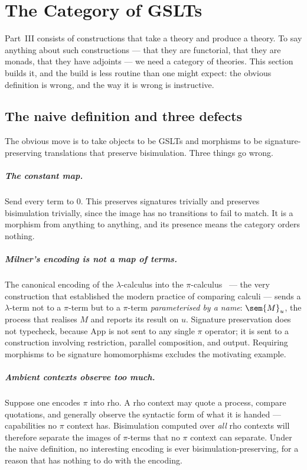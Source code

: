 \chapter{The Category of GSLTs}
\label{ch:catgslt}

Part~III consists of constructions that take a theory and produce a theory. To say
anything about such constructions --- that they are functorial, that they are monads,
that they have adjoints --- we need a category of theories. This section builds it, and
the build is less routine than one might expect: the obvious definition is wrong, and
the way it is wrong is instructive.

\section{The naive definition and three defects}

The obvious move is to take objects to be GSLTs and morphisms to be signature-preserving
translations that preserve bisimulation. Three things go wrong.

\paragraph{The constant map.} Send every term to $0$. This preserves signatures
trivially and preserves bisimulation trivially, since the image has no transitions to
fail to match. It is a morphism from anything to anything, and its presence means the
category orders nothing.

\paragraph{Milner's encoding is not a map of terms.} The canonical encoding of the
$\lambda$-calculus into the $\pi$-calculus~\cite{Milner1992} --- the very construction
that established the modern practice of comparing calculi --- sends a $\lambda$-term not
to a $\pi$-term but to a $\pi$-term \emph{parameterised by a name}: $\sem{M}_u$, the
process that realises $M$ and reports its result on $u$. Signature preservation does not
typecheck, because $\mathrm{App}$ is not sent to any single $\pi$ operator; it is sent to
a construction involving restriction, parallel composition, and output. Requiring
morphisms to be signature homomorphisms excludes the motivating example.

\paragraph{Ambient contexts observe too much.} Suppose one encodes $\pi$ into rho. A rho
context may quote a process, compare quotations, and generally observe the syntactic
form of what it is handed --- capabilities no $\pi$ context has. Bisimulation computed
over \emph{all} rho contexts will therefore separate the images of $\pi$-terms that no
$\pi$ context can separate. Under the naive definition, no interesting encoding is ever
bisimulation-preserving, for a reason that has nothing to do with the encoding.

